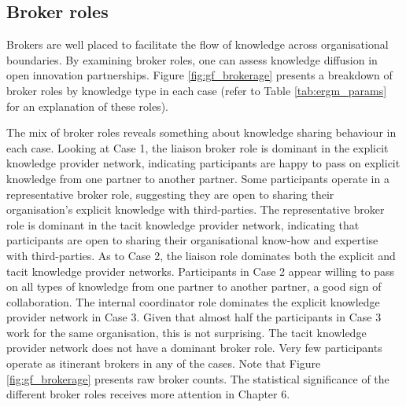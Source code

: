 \subsection{Broker roles}

Brokers are well placed to facilitate the flow of knowledge across organisational boundaries. By examining broker roles, one can assess knowledge diffusion in open innovation partnerships. Figure \ref{fig:gf_brokerage} presents a breakdown of \citet{gould1989structures} broker roles by knowledge type in each case (refer to Table \ref{tab:ergm_params} for an explanation of these roles).  \medskip

The mix of broker roles reveals something about knowledge sharing behaviour in each case. Looking at Case 1, the liaison broker role is dominant in the explicit knowledge provider network, indicating participants are happy to pass on explicit knowledge from one partner to another partner. Some participants operate in a representative broker role, suggesting they are open to sharing their organisation's explicit knowledge with third-parties. The representative broker role is dominant in the tacit knowledge provider network, indicating that participants are open to sharing their organisational know-how and expertise with third-parties. As to Case 2, the liaison role dominates both the explicit and tacit knowledge provider networks. Participants in Case 2 appear willing to pass on all types of knowledge from one partner to another partner, a good sign of collaboration. The internal coordinator role dominates the explicit knowledge provider network in Case 3. Given that almost half the participants in Case 3 work for the same organisation, this is not surprising. The tacit knowledge provider network does not have a dominant broker role. Very few participants operate as itinerant brokers in any of the cases. Note that Figure \ref{fig:gf_brokerage} presents raw broker counts. The statistical significance of the different broker roles receives more attention in Chapter 6. \medskip

